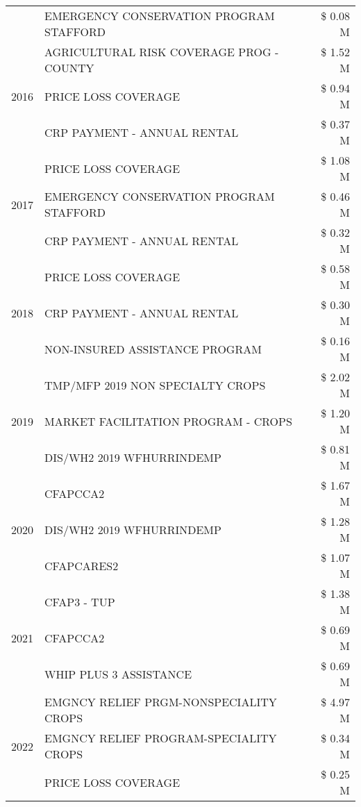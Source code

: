 \begin{tabular}{llr}
 & EMERGENCY CONSERVATION PROGRAM STAFFORD & \$ 0.08 M \\
\cline{1-3}
\multirow[t]{3}{*}{2016} & AGRICULTURAL RISK COVERAGE PROG - COUNTY & \$ 1.52 M \\
 & PRICE LOSS COVERAGE & \$ 0.94 M \\
 & CRP PAYMENT - ANNUAL RENTAL & \$ 0.37 M \\
\cline{1-3}
\multirow[t]{3}{*}{2017} & PRICE LOSS COVERAGE & \$ 1.08 M \\
 & EMERGENCY CONSERVATION PROGRAM STAFFORD & \$ 0.46 M \\
 & CRP PAYMENT - ANNUAL RENTAL & \$ 0.32 M \\
\cline{1-3}
\multirow[t]{3}{*}{2018} & PRICE LOSS COVERAGE & \$ 0.58 M \\
 & CRP PAYMENT - ANNUAL RENTAL & \$ 0.30 M \\
 & NON-INSURED ASSISTANCE PROGRAM & \$ 0.16 M \\
\cline{1-3}
\multirow[t]{3}{*}{2019} & TMP/MFP 2019 NON SPECIALTY CROPS & \$ 2.02 M \\
 & MARKET FACILITATION PROGRAM - CROPS & \$ 1.20 M \\
 & DIS/WH2 2019 WFHURRINDEMP & \$ 0.81 M \\
\cline{1-3}
\multirow[t]{3}{*}{2020} & CFAPCCA2 & \$ 1.67 M \\
 & DIS/WH2 2019 WFHURRINDEMP & \$ 1.28 M \\
 & CFAPCARES2 & \$ 1.07 M \\
\cline{1-3}
\multirow[t]{3}{*}{2021} & CFAP3 - TUP & \$ 1.38 M \\
 & CFAPCCA2 & \$ 0.69 M \\
 & WHIP PLUS 3 ASSISTANCE & \$ 0.69 M \\
\cline{1-3}
\multirow[t]{3}{*}{2022} & EMGNCY RELIEF PRGM-NONSPECIALITY CROPS & \$ 4.97 M \\
 & EMGNCY RELIEF PROGRAM-SPECIALITY CROPS & \$ 0.34 M \\
 & PRICE LOSS COVERAGE & \$ 0.25 M \\
\cline{1-3}
\bottomrule
\end{tabular}
